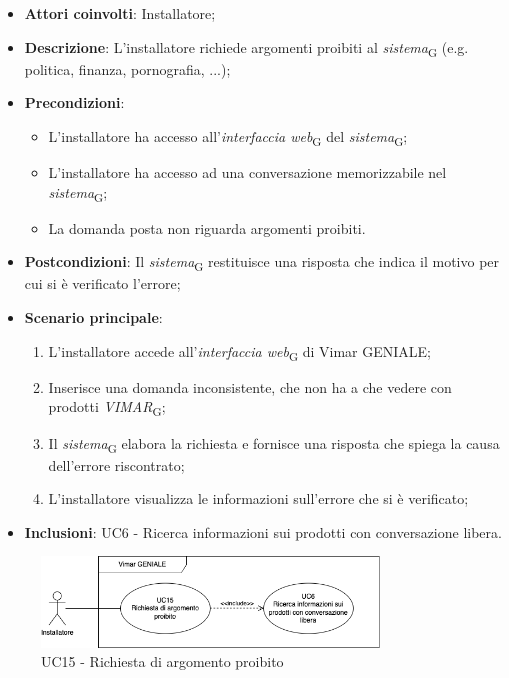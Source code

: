 \begin{itemize}
    \item \textbf{Attori coinvolti}: Installatore;
    \item \textbf{Descrizione}: L’installatore richiede argomenti proibiti al \textit{sistema}\textsubscript{G} (e.g. politica, finanza, pornografia, ...);
    \item \textbf{Precondizioni}: 
        \begin{itemize}
            \item L’installatore ha accesso all’\textit{interfaccia web}\textsubscript{G} del \textit{sistema}\textsubscript{G};
            \item L’installatore ha accesso ad una conversazione memorizzabile nel \textit{sistema}\textsubscript{G};
            \item La domanda posta non riguarda argomenti proibiti.
        \end{itemize}
    \item \textbf{Postcondizioni}: Il \textit{sistema}\textsubscript{G} restituisce una risposta che indica il motivo per cui si è verificato l’errore;
    \item \textbf{Scenario principale}:
    \begin{enumerate}
    \item L’installatore accede all’\textit{interfaccia web}\textsubscript{G} di Vimar GENIALE;
    \item Inserisce una domanda inconsistente, che non ha a che vedere con prodotti \textit{VIMAR}\textsubscript{G};
    \item Il \textit{sistema}\textsubscript{G} elabora la richiesta e fornisce una risposta che spiega la causa dell'errore riscontrato;
    \item L’installatore visualizza le informazioni sull’errore che si è verificato;
    \end{enumerate}
     \item \textbf{Inclusioni}: UC6 - Ricerca informazioni sui prodotti con conversazione libera.
\end{itemize}
\begin{figure}[H]
\centering
\includegraphics[width=0.8\textwidth]{contents/casi_duso/png/UC15.png}
\caption{UC15 - Richiesta di argomento proibito}
\end{figure}

